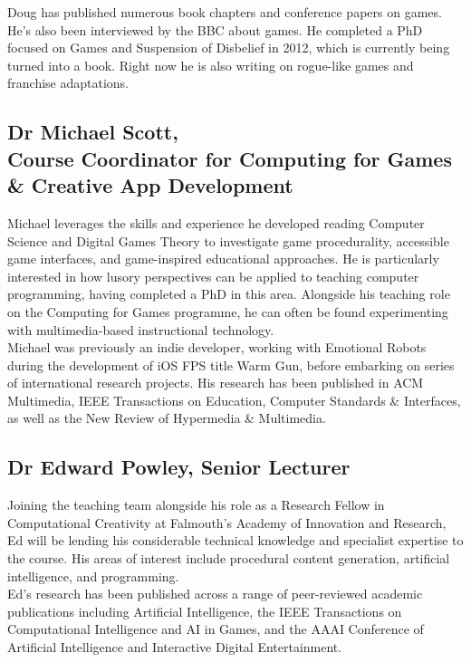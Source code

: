 Doug has published numerous book chapters and conference papers on games. He's also been interviewed by the BBC about games. He completed a PhD focused on Games and Suspension of Disbelief in 2012, which is currently being turned into a book. Right now he is also writing on rogue-like games and franchise adaptations. \\

\subsection[Michael Scott]{Dr Michael Scott, \\ Course Coordinator for Computing for Games \& Creative App Development}

Michael leverages the skills and experience he developed reading Computer Science and Digital Games Theory to investigate game procedurality, accessible game interfaces, and game-inspired educational approaches. He is particularly interested in how lusory perspectives can be applied to teaching computer programming, having completed a PhD in this area. Alongside his teaching role on the Computing for Games programme, he can often be found experimenting with multimedia-based instructional technology.\\

Michael was previously an indie developer, working with Emotional Robots during the development of iOS FPS title Warm Gun, before embarking on series of international research projects. His research has been published in ACM Multimedia, IEEE Transactions on Education, Computer Standards \& Interfaces, as well as the New Review of Hypermedia \& Multimedia.\\

\subsection{Dr Edward Powley, Senior Lecturer}

Joining the teaching team alongside his role as a Research Fellow in Computational Creativity at Falmouth's Academy of Innovation and Research, Ed will be lending his considerable technical knowledge and specialist expertise to the course. His areas of interest include procedural content generation, artificial intelligence, and programming. \\

Ed's research has been published across a range of peer-reviewed academic publications including Artificial Intelligence, the IEEE Transactions on Computational Intelligence and AI in Games, and the AAAI Conference of Artificial Intelligence and Interactive Digital Entertainment. \\

